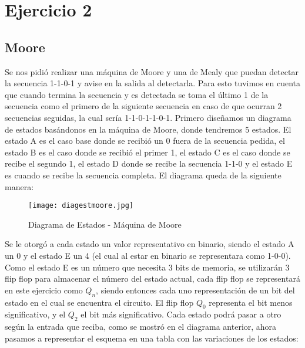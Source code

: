 \documentclass[10pt,a4paper]{article}
\begin{document}
\section{Ejercicio 2}

\subsection{Moore}
Se nos pidi\'o realizar una m\'aquina de Moore y una de Mealy que puedan detectar la secuencia 1-1-0-1 y avise en la salida al detectarla. Para esto tuvimos en cuenta que cuando termina la secuencia y es detectada se toma el \'ultimo 1 de la secuencia como el primero de la siguiente secuencia en caso de que ocurran 2 secuencias seguidas, la cual ser\'ia 1-1-0-1-1-0-1. Primero diseñamos un diagrama de estados basándonos en la m\'aquina de Moore, donde tendremos 5 estados. El estado A es el caso base donde se recibió un 0 fuera de la secuencia pedida, el estado B es el caso donde se recibió el primer 1, el estado C es el caso donde se recibe el segundo 1, el estado D donde se recibe la secuencia 1-1-0 y el estado E es cuando se recibe la secuencia completa. 
El diagrama queda de la siguiente manera:

\begin{figure}[hbtp]
	\centering
		\texttt{[image: diagestmoore.jpg]}
	\caption{Diagrama de Estados - Máquina de Moore}
	\label{2_fig0}
\end{figure}

Se le otorgó a cada estado un valor representativo en binario, siendo el estado A un 0 y el estado E un 4 (el cual al estar en binario se representara como 1-0-0). Como el estado E es un número que necesita 3 bits de memoria, se utilizar\'an 3 flip flop para almacenar el número del estado actual, cada flip flop se representar\'a en este ejercicio como $Q_n$, siendo entonces cada uno representación de un bit del estado en el cual se encuentra el circuito. El flip flop $Q_0$ representa el bit menos significativo, y el $Q_2$ el bit más significativo. Cada estado podr\'a pasar a otro seg\'un la entrada que reciba, como se mostr\'o en el diagrama anterior, ahora pasamos a representar el esquema en una tabla con las variaciones de los estados:
\end{document}
